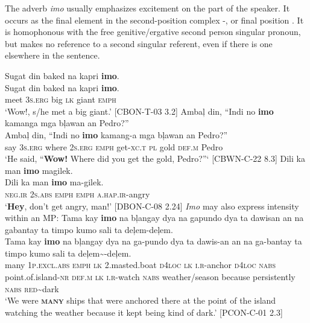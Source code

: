 The adverb \textit{imo} usually emphasizes excitement on the part of the speaker. It occurs as the final element in the second-position complex -, or final position . It is homophonous with the free genitive/ergative second person singular pronoun, but makes no reference to a second singular referent, even if there is one elsewhere in the sentence.

\ea
\label{bkm:Ref329763033}
\label{bkm:Ref441331337}
Sugat  din  baked  na  kapri  \textbf{imo}. \\\smallskip
 \gll Sugat  din  baked  na  kapri  \textbf{imo}. \\
meet  3\textsc{s.erg}  big  \textsc{lk}  giant  \textsc{emph} \\
\glt ‘Wow!, s/he met a big giant.’ [CBON-T-03 3.2]
\z
\ea
Ambaļ  din,  “Indi  no  \textbf{imo}  kamanga  mga  bļawan  an  Pedro?” \\\smallskip
 \gll Ambaļ  din,  “Indi  no  \textbf{imo}  kamang-a  mga  bļawan  an  Pedro?” \\
say  3\textsc{s.erg}  where  2\textsc{s.erg}  \textsc{emph}  get-\textsc{xc.t}  \textsc{pl}  gold  \textsc{def.m}  Pedro \\
\glt ‘He said, “\textbf{Wow!} Where did you get the gold, Pedro?”‘ [CBWN-C-22 8.3]
\z
\ea
\label{bkm:Ref443714404}
Dili  ka  man  \textbf{imo}  magilek. \\\smallskip
 \gll Dili  ka  man  \textbf{imo}  ma-gilek. \\
\textsc{neg.ir}  2\textsc{s.abs}  \textsc{emph}  \textsc{emph}  \textsc{a.hap.ir}-angry \\
\glt ‘\textbf{Hey}, don’t get angry, man!’ [DBON-C-08 2.24]
\z
\textit{Imo} may also express intensity within an MP:
\ea
Tama  kay  \textbf{imo}  na  bļangay  dya  na  gapundo  dya ta  dawisan  an  na  gabantay  ta  timpo  kumo sali  ta  deļem-deļem. \\\smallskip
 \gll Tama  kay  \textbf{imo}  na  bļangay  dya  na  ga-pundo  dya ta  dawis-an  an  na  ga-bantay  ta  timpo  kumo sali  ta  deļem\sim{}-deļem. \\
many  1\textsc{p.excl.abs}  \textsc{emph}  \textsc{lk}  2.masted.boat  \textsc{d}4\textsc{loc}  \textsc{lk}  \textsc{i.r}-anchor  \textsc{d}4\textsc{loc}
\textsc{nabs}  point.of.island-\textsc{nr}  \textsc{def.m}  \textsc{lk}  \textsc{i.r}-watch  \textsc{nabs}  weather/season  because
persistently  \textsc{nabs}  \textsc{red}\sim{}dark \\
\glt `We were \textbf{\textsc{many}} ships that were anchored there at the point of the island watching the weather because it kept being kind of dark.’ [PCON-C-01 2.3]
\z

